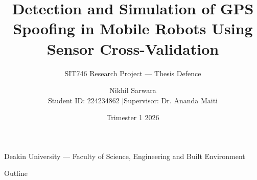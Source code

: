 \documentclass[11pt]{beamer}
\title[Detection \& Simulation of GPS Spoofing]{Detection and Simulation of GPS Spoofing in Mobile Robots Using Sensor Cross-Validation}
\subtitle{SIT746 Research Project — Thesis Defence}
\author{Nikhil Sarwara \\[1mm] \tiny Student ID: 224234862 \quad|\quad Supervisor: Dr. Ananda Maiti}
\date{Trimester 1 2026}
\begin{document}
\begin{frame}
\maketitle
\vspace{-5mm}
\begin{center}
\tiny Deakin University — Faculty of Science, Engineering and Built Environment
\end{center}
\end{frame}

\begin{frame}{Outline}
\tableofcontents[hideallsubsections,sectionstyle=show,subsectionstyle=hide]
\end{frame}

\end{document}
